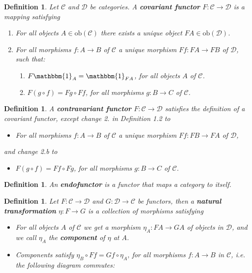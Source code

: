 \documentclass[11pt]{report}
\newcommand{\mcC}{\mathcal{C}}
\newcommand{\mcD}{\mathcal{D}}
\newcommand{\ob}{\text{ob}}
\newtheorem{defn}[thm]{Definition} %
\begin{document}
\begin{defn}
  Let $\mcC$ and $\mcD$ be categories. A \textbf{covariant functor } $F: \mcC \to \mcD$ is a mapping satisfying
  \begin{enumerate}
  \item For all objects $A \in \ob(\mcC)$ there exists a unique object $FA \in \ob(\mcD)$.
  \item For all morphisms $f:A \to B$ of $\mcC$ a unique morphism $Ff:FA \to FB$ of $\mcD$, such that:
    \begin{enumerate}
    \item $F\mathbbm{1}_A = \mathbbm{1}_{FA}$, for all objects $A$ of $\mcC$. \\
    \item $F(g \circ f) = Fg \circ Ff$, for all morphisms $g: B \to C$ of $\mcC$.
    \end{enumerate}
  \end{enumerate}
\end{defn}
\begin{defn}
  A \textbf{contravariant functor} $F: \mcC \to \mcD$ satisfies the definition of a covariant functor, except change 2. in Definition 1.2 to
  \begin{itemize}
    \item For all morphisms $f:A \to B$ of $\mcC$ a unique morphism $Ff:FB \to FA$ of $\mcD$,
  \end{itemize}
  and change 2.b to
  \begin{itemize}
    \item $F(g \circ f) = Ff \circ Fg$, for all morphisms $g: B \to C$ of $\mcC$.
  \end{itemize}
\end{defn}

\begin{defn}
  An \textbf{endofunctor} is a functor that maps a category to itself. 
\end{defn}

\begin{defn}
  Let $F: \mcC \to \mcD$ and $G: \mcD \to \mcC$ be functors, then a \textbf{natural transformation} $\eta: F \to G$ is a collection of morphisms satisfying
  \begin{itemize}
    \item For all objects $A$ of $\mcC$ we get a morphism $\eta_A: FA \to GA$ of objects in $\mcD$, and we call $\eta_A$ the \textbf{component }of $\eta$ at $A$. \\
    \item Components satisfy $\eta_B \circ Ff = Gf \circ \eta_A$, for all morphisms $f: A \to B$ in $\mcC$,
      i.e. the following diagram commutes:
      \begin{center}
      \end{center}

  \end{itemize}
\end{defn}
\end{document}

